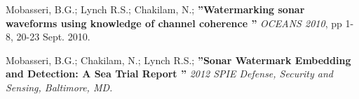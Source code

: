 \documentclass[12pt,a4paper]{article} %
\begin{document}

\inlineheadsection %
{Mobasseri, B.G.; Lynch R.S.; Chakilam, N.;}
{\textbf{''Watermarking sonar waveforms using knowledge of channel coherence ''} \textit{OCEANS 2010}, pp 1-8, 20-23 Sept. 2010.}

\inlineheadsection %
{Mobasseri, B.G.; Chakilam, N.; Lynch R.S.; }
{\textbf{''Sonar Watermark Embedding and Detection: A Sea Trial Report ''} \textit{2012 SPIE Defense, Security and Sensing, Baltimore, MD.}}
\end{document}
